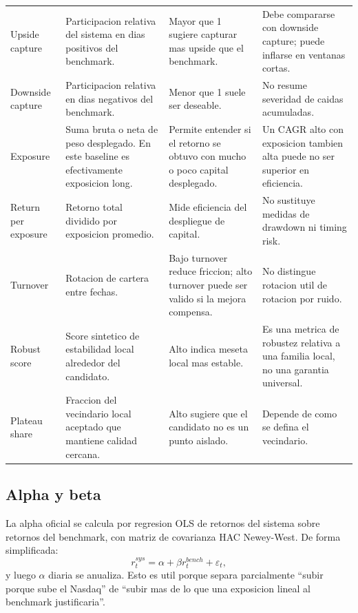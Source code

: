 \documentclass[11pt,letterpaper]{article}
\begin{document}
\begin{longtable}{>{\raggedright\arraybackslash}p{}>{\raggedright\arraybackslash}p{}>{\raggedright\arraybackslash}p{}>{\raggedright\arraybackslash}p{}}
Upside capture & Participacion relativa del sistema en dias positivos del benchmark. & Mayor que 1 sugiere capturar mas upside que el benchmark. & Debe compararse con downside capture; puede inflarse en ventanas cortas. \\
Downside capture & Participacion relativa en dias negativos del benchmark. & Menor que 1 suele ser deseable. & No resume severidad de caidas acumuladas. \\
Exposure & Suma bruta o neta de peso desplegado. En este baseline es efectivamente exposicion long. & Permite entender si el retorno se obtuvo con mucho o poco capital desplegado. & Un CAGR alto con exposicion tambien alta puede no ser superior en eficiencia. \\
Return per exposure & Retorno total dividido por exposicion promedio. & Mide eficiencia del despliegue de capital. & No sustituye medidas de drawdown ni timing risk. \\
Turnover & Rotacion de cartera entre fechas. & Bajo turnover reduce friccion; alto turnover puede ser valido si la mejora compensa. & No distingue rotacion util de rotacion por ruido. \\
Robust score & Score sintetico de estabilidad local alrededor del candidato. & Alto indica meseta local mas estable. & Es una metrica de robustez relativa a una familia local, no una garantia universal. \\
Plateau share & Fraccion del vecindario local aceptado que mantiene calidad cercana. & Alto sugiere que el candidato no es un punto aislado. & Depende de como se defina el vecindario. \\
\bottomrule
\end{longtable}

\subsection{Alpha y beta}
La alpha oficial se calcula por regresion OLS de retornos del sistema sobre retornos del benchmark, con matriz de covarianza HAC Newey-West. De forma simplificada:
\begin{equation}
r^{sys}_t = \alpha + \beta r^{bench}_t + \varepsilon_t,
\end{equation}
y luego \(\alpha\) diaria se anualiza. Esto es util porque separa parcialmente \enquote{subir porque sube el Nasdaq} de \enquote{subir mas de lo que una exposicion lineal al benchmark justificaria}.
\end{document}
